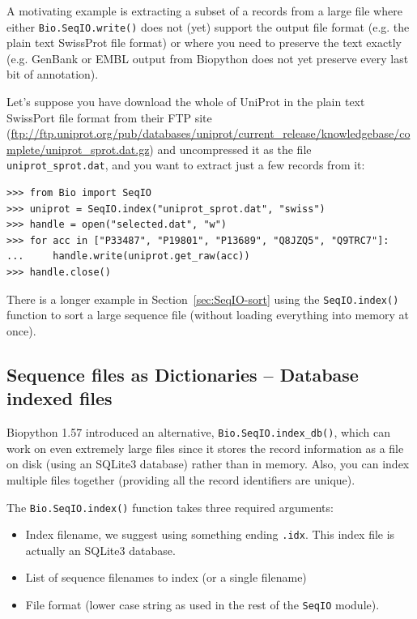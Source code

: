 \documentclass{report}
\begin{document}
A motivating example is extracting a subset of a records from a large
file where either \verb|Bio.SeqIO.write()| does not (yet) support the
output file format (e.g. the plain text SwissProt file format) or
where you need to preserve the text exactly (e.g. GenBank or EMBL
output from Biopython does not yet preserve every last bit of
annotation).

Let's suppose you have download the whole of UniProt in the plain
text SwissPort file format from their FTP site
(\url{ftp://ftp.uniprot.org/pub/databases/uniprot/current_release/knowledgebase/complete/uniprot_sprot.dat.gz})
and uncompressed it as the file \verb|uniprot_sprot.dat|, and you
want to extract just a few records from it:

\begin{verbatim}
>>> from Bio import SeqIO
>>> uniprot = SeqIO.index("uniprot_sprot.dat", "swiss")
>>> handle = open("selected.dat", "w")
>>> for acc in ["P33487", "P19801", "P13689", "Q8JZQ5", "Q9TRC7"]:
...     handle.write(uniprot.get_raw(acc))
>>> handle.close()
\end{verbatim}

There is a longer example in Section~\ref{sec:SeqIO-sort} using the
\verb|SeqIO.index()| function to sort a large sequence file (without
loading everything into memory at once).

\subsection{Sequence files as Dictionaries -- Database indexed files}
\label{sec:SeqIO-index-db}

Biopython 1.57 introduced an alternative, \verb|Bio.SeqIO.index_db()|, which
can work on even extremely large files since it stores the record information
as a file on disk (using an SQLite3 database) rather than in memory. Also,
you can index multiple files together (providing all the record identifiers
are unique).

The \verb|Bio.SeqIO.index()| function takes three required arguments:
\begin{itemize}
\item Index filename, we suggest using something ending \texttt{.idx}.
This index file is actually an SQLite3 database.
\item List of sequence filenames to index (or a single filename)
\item File format (lower case string as used in the rest of the
\verb|SeqIO| module).
\end{itemize}
\end{document}
